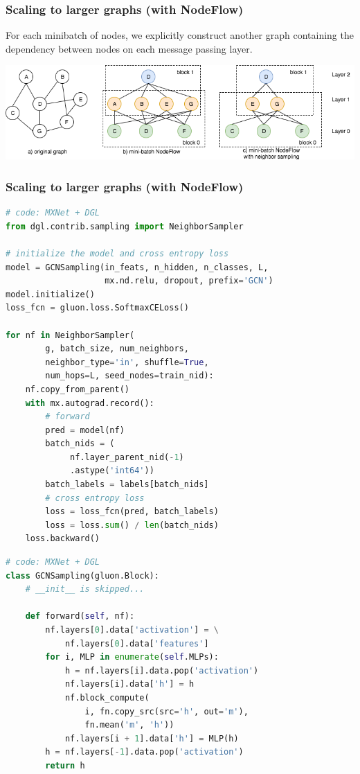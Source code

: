 \documentclass[10pt,aspectratio=169]{beamer}
\begin{document}
	\begin{frame}
		\frametitle{Scaling to larger graphs (with NodeFlow)}
		For each minibatch of nodes, we explicitly construct another graph containing the dependency between nodes on each message passing layer.
		\begin{center}
			\centering
			\includegraphics[width=\textwidth]{nodeflow2.png}
		\end{center}
	\end{frame}

	\begin{frame}[fragile]
		\frametitle{Scaling to larger graphs (with NodeFlow)}
		\begin{minipage}{0.45\textwidth}
\begin{lstlisting}[language=Python]
# code: MXNet + DGL
from dgl.contrib.sampling import NeighborSampler

# initialize the model and cross entropy loss
model = GCNSampling(in_feats, n_hidden, n_classes, L,
                    mx.nd.relu, dropout, prefix='GCN')
model.initialize()
loss_fcn = gluon.loss.SoftmaxCELoss()

for nf in NeighborSampler(
        g, batch_size, num_neighbors,
        neighbor_type='in', shuffle=True,
        num_hops=L, seed_nodes=train_nid):
    nf.copy_from_parent()
    with mx.autograd.record():
        # forward
        pred = model(nf)
        batch_nids = (
             nf.layer_parent_nid(-1)
             .astype('int64'))
        batch_labels = labels[batch_nids]
        # cross entropy loss
        loss = loss_fcn(pred, batch_labels)
        loss = loss.sum() / len(batch_nids)
    loss.backward()
\end{lstlisting}
		\end{minipage}\hfill%
		\begin{minipage}{0.45\textwidth}
\begin{lstlisting}[language=Python]
# code: MXNet + DGL
class GCNSampling(gluon.Block):
    # __init__ is skipped...
    
    def forward(self, nf):
        nf.layers[0].data['activation'] = \
            nf.layers[0].data['features']
        for i, MLP in enumerate(self.MLPs):
            h = nf.layers[i].data.pop('activation')
            nf.layers[i].data['h'] = h
            nf.block_compute(
                i, fn.copy_src(src='h', out='m'),
                fn.mean('m', 'h'))
            nf.layers[i + 1].data['h'] = MLP(h)
        h = nf.layers[-1].data.pop('activation')
        return h
\end{lstlisting}
		\end{minipage}
	\end{frame}
\end{document}
